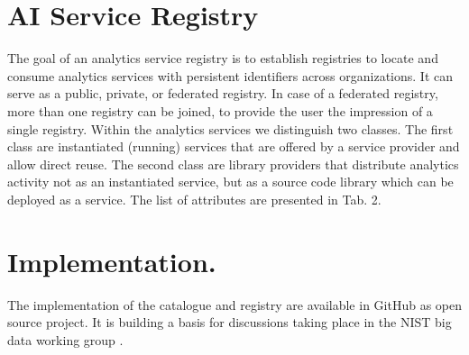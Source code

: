 \documentclass[A0,6pt]{article}
\begin{document}
\begin{multicols}{3}
\section*{AI Service Registry} The goal of an analytics service registry is to establish registries to locate and consume analytics services 
with persistent identifiers across organizations.  It can serve as a public, private, or federated registry. In case of a federated registry, more than one registry can be joined, to provide the user the impression of a single registry.
Within the analytics services we distinguish two classes. The first class are instantiated (running) services that are offered by a service provider and allow direct reuse. The second class are library providers that distribute analytics activity not as an instantiated service, but as a source code library which can be deployed as a service. The list of attributes are presented in Tab. 2.

\section*{Implementation.}

The implementation of the catalogue and registry are available in GitHub as open source project. It is building a basis for discussions taking place in the
NIST big data working group \cite{github-cloudmesh-catalogue}.


\end{multicols}
\end{document}
